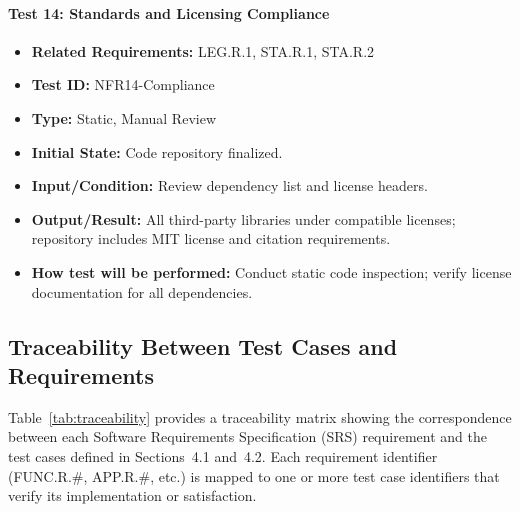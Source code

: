 \documentclass[12pt, titlepage]{article}
\begin{document}
\paragraph{Test 14: Standards and Licensing Compliance}
\begin{itemize}
    \item \textbf{Related Requirements:} LEG.R.1, STA.R.1, STA.R.2
    \item \textbf{Test ID:} NFR14-Compliance
    \item \textbf{Type:} Static, Manual Review
    \item \textbf{Initial State:} Code repository finalized.
    \item \textbf{Input/Condition:} Review dependency list and license headers.
    \item \textbf{Output/Result:} All third-party libraries under compatible licenses; repository includes MIT license and citation requirements.
    \item \textbf{How test will be performed:} Conduct static code inspection; verify license documentation for all dependencies.
\end{itemize}


\subsection{Traceability Between Test Cases and Requirements}

Table~\ref{tab:traceability} provides a traceability matrix showing the correspondence between each Software Requirements Specification (SRS) requirement and the test cases defined in Sections~4.1 and~4.2. Each requirement identifier (FUNC.R.\#, APP.R.\#, etc.) is mapped to one or more test case identifiers that verify its implementation or satisfaction.
\end{document}
